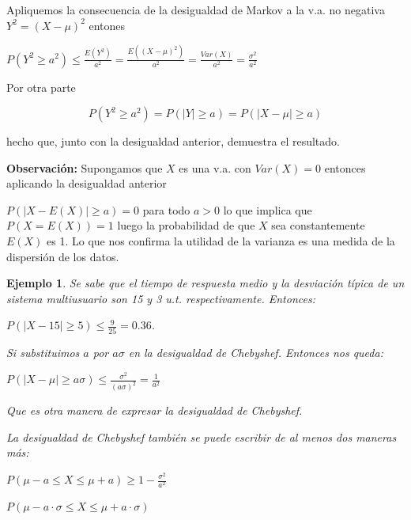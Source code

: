 \documentclass[12pt]{report}
\newtheorem{example}[definition]{Ejemplo}
\begin{document}
          Apliquemos la consecuencia de la desigualdad de Markov a la v.a.
          no negativa $Y^2=(X-\mu)^{2}$ entones

          $P(Y^2\geq a^2)\leq
          \frac{E(Y^2)}{a^2}=\frac{E((X-\mu)^{2})}{a^2}=
          \frac{Var(X)}{a^2}=\frac{\sigma^{2}}{a^{2}}$

          Por otra parte

          $$P(Y^2\geq a^2)=P(|Y|\geq a)= P(|X-\mu|\geq a)$$

           hecho que, junto con la desigualdad anterior,
          demuestra el resultado.



         \textbf{Observación:} Supongamos que $X$ es una v.a. con $Var(X)=0$
         entonces aplicando la desigualdad anterior

         $P(|X-E(X)|\geq a )=0$ para todo $a>0$ lo que implica que
         $P(X=E(X))=1$ luego la probabilidad de que $X$ sea
         constantemente $E(X)$ es 1. Lo que nos confirma la utilidad de la varianza es una
         medida de la dispersión de los datos.

         \begin{example}

         Se sabe que el tiempo de respuesta medio y la desviación típica de
         un sistema multiusuario  son 15 y 3 u.t.
         respectivamente. Entonces:

         $P(|X-15|\geq 5)\leq \frac{9}{25}=0.36$.

         Si substituimos $a$ por $a\sigma$ en la
         desigualdad de Chebyshef. Entonces nos queda:

         $P(|X-\mu|\geq a \sigma)\leq
         \frac{\sigma^2}{(a\sigma)^2}=\frac{1}{a^2}$

         Que es otra manera de expresar la desigualdad de Chebyshef.

         La desigualdad de Chebyshef también se puede escribir de al menos dos maneras más:

         $P(\mu-a\leq X\leq \mu+a)\geq 1-\frac{\sigma^2}{a^2}$

         $P(\mu-a\cdot \sigma\leq X\leq \mu+ a \cdot \sigma)$
\end{example}
\end{document}

